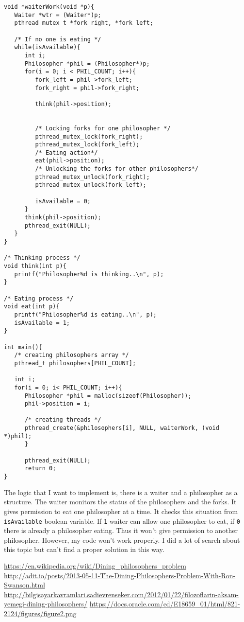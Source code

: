 \documentclass[12pt,a4paper]{report}
\begin{document}
\begin{flushleft}
\begin{verbatim}
void *waiterWork(void *p){
   Waiter *wtr = (Waiter*)p;
   pthread_mutex_t *fork_right, *fork_left;

   /* If no one is eating */
   while(isAvailable){
      int i;
      Philosopher *phil = (Philosopher*)p;
      for(i = 0; i < PHIL_COUNT; i++){			
         fork_left = phil->fork_left;
         fork_right = phil->fork_right;

         think(phil->position);

         
         /* Locking forks for one philosopher */
         pthread_mutex_lock(fork_right);
         pthread_mutex_lock(fork_left);
         /* Eating action*/
         eat(phil->position);
         /* Unlocking the forks for other philosophers*/
         pthread_mutex_unlock(fork_right);
         pthread_mutex_unlock(fork_left);

         isAvailable = 0;
      }
      think(phil->position);
      pthread_exit(NULL);
   }
}

/* Thinking process */
void think(int p){
   printf("Philosopher%d is thinking..\n", p);
}

/* Eating process */
void eat(int p){
   printf("Philosopher%d is eating..\n", p);
   isAvailable = 1;
}

int main(){
   /* creating philosophers array */
   pthread_t philosophers[PHIL_COUNT];

   int i;
   for(i = 0; i< PHIL_COUNT; i++){
      Philosopher *phil = malloc(sizeof(Philosopher));
      phil->position = i;

      /* creating threads */
      pthread_create(&philosophers[i], NULL, waiterWork, (void *)phil);
      }

      pthread_exit(NULL);
      return 0;
}
  \end{verbatim}
  The logic that I want to implement is, there is a waiter and a philosopher as a structure. The waiter monitors the 
  status of the philosophers and the forks. It gives permission to eat one philosopher at a time. It checks 
  this situation from \verb|isAvailable| boolean variable. If \verb|1| waiter can allow one philosopher to eat, if \verb|0| 
  there is already a philosopher eating. Thus it won't give permission to another philosopher. However, my code won't work properly. I did a lot of search about this topic but can't find a proper 
  solution in this way.
 \end{flushleft}
 
  \begin{thebibliography}{9}
    \url{https://en.wikipedia.org/wiki/Dining_philosophers_problem}
    \url{http://adit.io/posts/2013-05-11-The-Dining-Philosophers-Problem-With-Ron-Swanson.html}
    \url{http://bilgisayarkavramlari.sadievrenseker.com/2012/01/22/filozoflarin-aksam-yemegi-dining-philosophers/}
    \url{https://docs.oracle.com/cd/E18659_01/html/821-2124/figures/figure2.png}
 \end{thebibliography}
\end{document}
